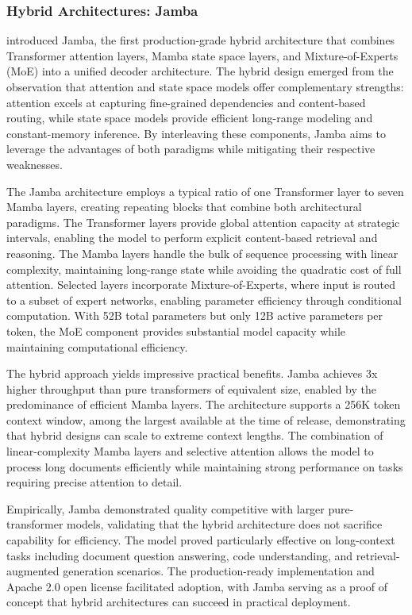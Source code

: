 \subsubsection{Hybrid Architectures: Jamba}

\citet{lieber2024jamba} introduced Jamba, the first production-grade hybrid architecture that combines Transformer attention layers, Mamba state space layers, and Mixture-of-Experts (MoE) into a unified decoder architecture. The hybrid design emerged from the observation that attention and state space models offer complementary strengths: attention excels at capturing fine-grained dependencies and content-based routing, while state space models provide efficient long-range modeling and constant-memory inference. By interleaving these components, Jamba aims to leverage the advantages of both paradigms while mitigating their respective weaknesses.

The Jamba architecture employs a typical ratio of one Transformer layer to seven Mamba layers, creating repeating blocks that combine both architectural paradigms. The Transformer layers provide global attention capacity at strategic intervals, enabling the model to perform explicit content-based retrieval and reasoning. The Mamba layers handle the bulk of sequence processing with linear complexity, maintaining long-range state while avoiding the quadratic cost of full attention. Selected layers incorporate Mixture-of-Experts, where input is routed to a subset of expert networks, enabling parameter efficiency through conditional computation. With 52B total parameters but only 12B active parameters per token, the MoE component provides substantial model capacity while maintaining computational efficiency.

The hybrid approach yields impressive practical benefits. Jamba achieves 3x higher throughput than pure transformers of equivalent size, enabled by the predominance of efficient Mamba layers. The architecture supports a 256K token context window, among the largest available at the time of release, demonstrating that hybrid designs can scale to extreme context lengths. The combination of linear-complexity Mamba layers and selective attention allows the model to process long documents efficiently while maintaining strong performance on tasks requiring precise attention to detail.

Empirically, Jamba demonstrated quality competitive with larger pure-transformer models, validating that the hybrid architecture does not sacrifice capability for efficiency. The model proved particularly effective on long-context tasks including document question answering, code understanding, and retrieval-augmented generation scenarios. The production-ready implementation and Apache 2.0 open license facilitated adoption, with Jamba serving as a proof of concept that hybrid architectures can succeed in practical deployment.

